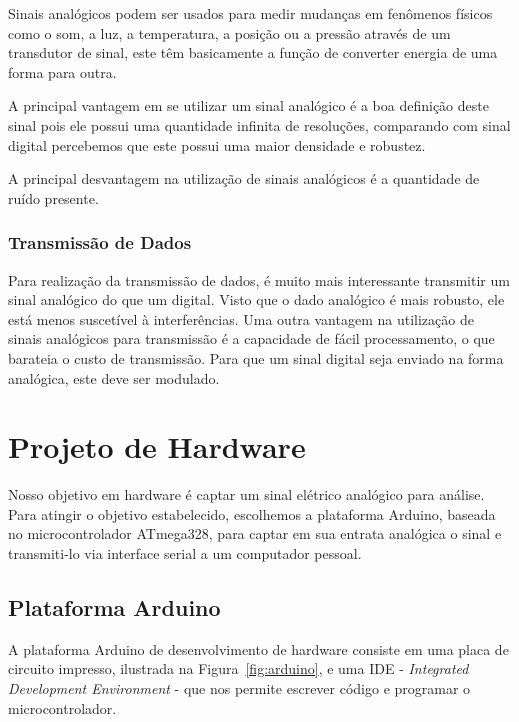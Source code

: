 \documentclass[12pt,a4paper]{report}
\begin{document}
Sinais analógicos podem ser usados para medir mudanças em fenômenos físicos como o som, a luz, a temperatura, a posição ou a pressão através de um transdutor de sinal, este têm basicamente a função de converter energia de uma forma para outra. 

A principal vantagem em se utilizar um sinal analógico é a boa definição deste sinal pois ele possui uma quantidade infinita de resoluções, comparando com sinal digital percebemos que este possui uma maior densidade e robustez.

A principal desvantagem na utilização de sinais analógicos é a quantidade de ruído presente.

\subsection{Transmissão de Dados}

Para realização da transmissão de dados, é muito mais interessante transmitir um sinal analógico do que um digital. Visto que o dado analógico é mais robusto, ele está menos suscetível à interferências. Uma outra vantagem na utilização de sinais analógicos para transmissão é a capacidade de fácil processamento, o que barateia o custo de transmissão. Para que um sinal digital seja enviado na forma analógica, este deve ser modulado.

\chapter{Projeto de Hardware}

Nosso objetivo em hardware é captar um sinal elétrico analógico para análise. Para atingir o objetivo estabelecido, escolhemos a plataforma Arduino, baseada no microcontrolador ATmega328, para captar em sua entrata analógica o sinal e transmiti-lo via interface serial a um computador pessoal.

\section{Plataforma Arduino}

A plataforma Arduino de desenvolvimento de hardware consiste em uma placa de circuito impresso, ilustrada na Figura~\ref{fig:arduino}, e uma IDE - \textit{Integrated Development Environment} - que nos permite escrever código e programar o microcontrolador.
\end{document}
